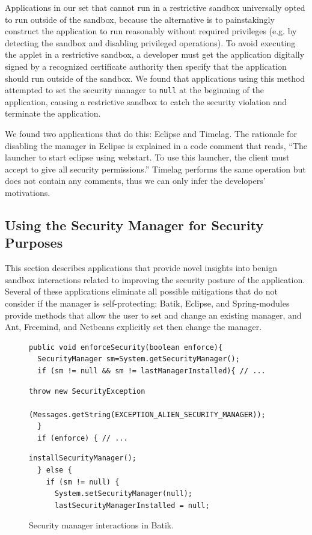 \documentclass{sig-alternate}
\begin{document}
Applications in our set that cannot run in a restrictive sandbox universally
opted to run outside of the sandbox, because the alternative is to painstakingly
construct the application to run reasonably without required privileges (e.g. by
detecting the sandbox and disabling privileged operations). To avoid executing
the applet in a restrictive 
sandbox, a developer must get the application digitally signed
by a recognized certificate authority then specify that the application should
run outside of the sandbox. We found that applications using this method attempted
to set the security manager to \texttt{null} at the beginning of the
application, causing a restrictive sandbox to catch the security violation and
terminate the application.

We found two applications that do this: Eclipse and
Timelag. The rationale for disabling the manager in Eclipse is explained in a
code comment that reads, ``The launcher to start eclipse using webstart. To use
this launcher, the client must accept to give all security permissions.'' Timelag
performs the same operation but does not contain any comments, thus we can only
infer the developers' motivations. 

\subsection{Using the Security Manager for Security Purposes}
\label{sub:Using-the-Security}

This section describes applications that provide novel insights into benign sandbox interactions related to improving the security
posture of the application. Several of these applications eliminate all possible mitigations that do not consider if the manager is self-protecting: Batik, Eclipse, and Spring-modules provide
methods that allow the user to set and change an existing manager,
and Ant, Freemind, and Netbeans explicitly set then change the manager.

\begin{figure}
\begin{lstlisting}[firstnumber=156]
public void enforceSecurity(boolean enforce){ 
  SecurityManager sm=System.getSecurityManager();
  if (sm != null && sm != lastManagerInstalled){ // ...
\end{lstlisting}
\vspace{-0.3cm}
\begin{lstlisting}[firstnumber=163]
   throw new SecurityException
     (Messages.getString(EXCEPTION_ALIEN_SECURITY_MANAGER));   
  }                  
  if (enforce) { // ...
\end{lstlisting}
\vspace{-0.3cm}
\begin{lstlisting}[firstnumber=173]
    installSecurityManager();         
  } else {             
    if (sm != null) {                 
      System.setSecurityManager(null);
      lastSecurityManagerInstalled = null;             
\end{lstlisting}
\caption{Security manager interactions \label{fig:Batik-snippet} in
  Batik.}
\end{figure}
\end{document}
